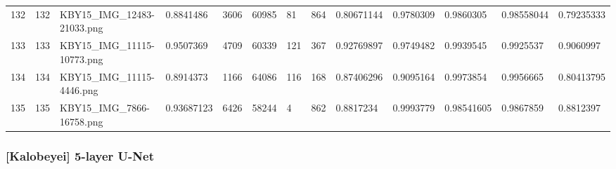 \documentclass[11pt, a4paper, twoside]{report}
\begin{document}
\begin{longtable}[c]{@{}lllllllllllll@{}}
132 & 132 & KBY15\_IMG\_12483-21033.png & 0.8841486 & 3606 & 60985 & 81 & 864 & 0.80671144 & 0.9780309 & 0.9860305 & 0.98558044 & 0.79235333 \\
133 & 133 & KBY15\_IMG\_11115-10773.png & 0.9507369 & 4709 & 60339 & 121 & 367 & 0.92769897 & 0.9749482 & 0.9939545 & 0.9925537 & 0.9060997 \\
134 & 134 & KBY15\_IMG\_11115-4446.png & 0.8914373 & 1166 & 64086 & 116 & 168 & 0.87406296 & 0.9095164 & 0.9973854 & 0.9956665 & 0.80413795 \\
135 & 135 & KBY15\_IMG\_7866-16758.png & 0.93687123 & 6426 & 58244 & 4 & 862 & 0.8817234 & 0.9993779 & 0.98541605 & 0.9867859 & 0.8812397 \\* \bottomrule
\end{longtable}

\newpage

\subsubsection{[Kalobeyei] 5-layer U-Net}
\end{document}
